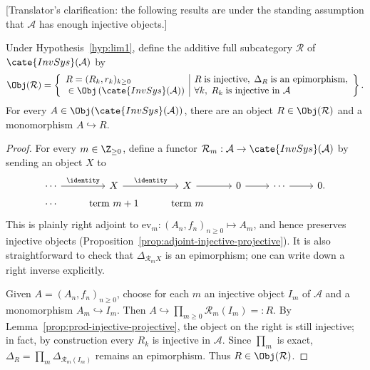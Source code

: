 [Translator's clarification: the following results are under the standing
assumption that $\mathcal{A}$ has enough injective objects.]

\begin{lemma}\label{prop:lim1-prep}
	Under Hypothesis~\ref{hyp:lim1}, define the additive full subcategory
	$\mathcal{R}$ of $\cate{InvSys}(\mathcal{A})$ by
	\[ \Obj(\mathcal{R}) = \left\{\begin{array}{l|l}
		R = (R_k, r_k)_{k \geq 0} & R \;\text{is injective}, \; \Delta_R \; \text{is an epimorphism}, \\
		\; \in \Obj\left( \cate{InvSys}(\mathcal{A}) \right) & \forall k, \; R_k \;\text{is injective in $\mathcal{A}$}
	\end{array}\right\}. \]
	For every $A\in\Obj(\cate{InvSys}(\mathcal{A}))$, there are an object
	$R\in\Obj(\mathcal{R})$ and a monomorphism $A\hookrightarrow R$.
\end{lemma}
\begin{proof}
	For every $m\in\Z_{\geq0}$, define a functor
	$\mathcal{R}_m:\mathcal{A}\to\cate{InvSys}(\mathcal{A})$ by sending an
	object $X$ to
	\begin{equation}\label{eqn:Rm-construction}\begin{tikzcd}[row sep=tiny]
		\cdots \arrow[r, "{\identity}"] & X \arrow[r, "{\identity}"] & X \arrow[r] & 0 \arrow[r] & \cdots \arrow[r] & 0. \\
		\cdots & \text{term $m+1$} & \text{term $m$} & & &
	\end{tikzcd}\end{equation}
	This is plainly right adjoint to
	$\mathrm{ev}_m:(A_n,f_n)_{n\geq0}\mapsto A_m$, and hence preserves
	injective objects (Proposition~\ref{prop:adjoint-injective-projective}).
	It is also straightforward to check that
	$\Delta_{\mathcal{R}_mX}$ is an epimorphism; one can write down a right
	inverse explicitly.

	Given $A=(A_n,f_n)_{n\geq0}$, choose for each $m$ an injective object
	$I_m$ of $\mathcal{A}$ and a monomorphism $A_m\hookrightarrow I_m$.
	Then
	$A\hookrightarrow\prod_{m\geq0}\mathcal{R}_m(I_m)=:R$. By
	Lemma~\ref{prop:prod-injective-projective}, the object on the right is
	still injective; in fact, by construction every $R_k$ is injective in
	$\mathcal{A}$. Since $\prod_m$ is exact,
	$\Delta_R=\prod_m\Delta_{\mathcal{R}_m(I_m)}$ remains an epimorphism.
	Thus $R\in\Obj(\mathcal{R})$.
\end{proof}

